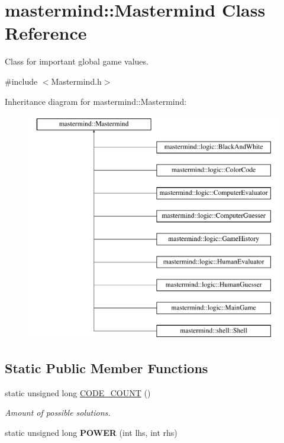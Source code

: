 \hypertarget{classmastermind_1_1_mastermind}{}\section{mastermind\+:\+:Mastermind Class Reference}
\label{classmastermind_1_1_mastermind}


Class for important global game values.  




{\ttfamily \#include $<$Mastermind.\+h$>$}

Inheritance diagram for mastermind\+:\+:Mastermind\+:\begin{figure}[H]
\begin{center}
\leavevmode
\includegraphics[height=10.000000cm]{classmastermind_1_1_mastermind}
\end{center}
\end{figure}
\subsection*{Static Public Member Functions}
\begin{DoxyCompactItemize}
\item 
static unsigned long \hyperlink{classmastermind_1_1_mastermind_af22130e134506ecb5e756b931e759a03}{C\+O\+D\+E\+\_\+\+C\+O\+U\+NT} ()
\begin{DoxyCompactList}\small\item\em Amount of possible solutions. \end{DoxyCompactList}\item 
\hypertarget{classmastermind_1_1_mastermind_a24e1947e0ead0b7610b14dbeea618fbd}{}\label{classmastermind_1_1_mastermind_a24e1947e0ead0b7610b14dbeea618fbd} 
static unsigned long {\bfseries P\+O\+W\+ER} (int lhs, int rhs)
\end{DoxyCompactItemize}
